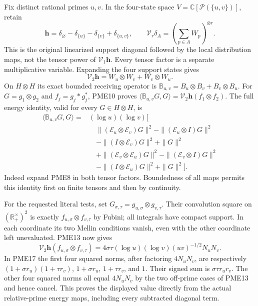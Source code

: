 \documentclass[11pt]{article}
\begin{document}
Fix distinct rational primes $u,v$. In the four-state space
$V=\mathbb C[\mathcal P(\{u,v\})]$, retain
\[
 \mathbf h=\delta_\varnothing-\delta_{\{u\}}
              -\delta_{\{v\}}+\delta_{\{u,v\}},\qquad
 \mathcal V_r\delta_A=\left(\sum_{p\in A}W_p\right)^{\otimes r}.
 \tag{PME15}
\]
This is the original linearized support diagonal followed by the
local distribution maps, not the tensor power of $\mathcal V_1\mathbf h$.
Every tensor factor is a separate multiplicative variable. Expanding
the four support states gives
\[
 \mathcal V_2\mathbf h=W_u\otimes W_v+W_v\otimes W_u.
 \tag{PME16}
\]
On $H\otimes H$ its exact bounded receiving operator is
$\mathbb B_{u,v}=B_u\otimes B_v+B_v\otimes B_u$.
For $G=g_1\otimes g_2$ and $f_j=g_j*g_j^*$,
PME10 proves $\langle\mathbb B_{u,v}G,G\rangle
=\mathcal V_2\mathbf h(f_1\otimes f_2)$.
The full energy identity, valid for every $G\in H\otimes H$, is
\[
\begin{aligned}
\langle\mathbb B_{u,v}G,G\rangle
={}&(\log u)(\log v)\big[\\
&\quad\|(\mathcal E_u\otimes\mathcal E_v)G\|^2
-\|(\mathcal E_u\otimes I)G\|^2\\
&\quad-\|(I\otimes\mathcal E_v)G\|^2+\|G\|^2\\
&\quad+\|(\mathcal E_v\otimes\mathcal E_u)G\|^2
-\|(\mathcal E_v\otimes I)G\|^2\\
&\quad-\|(I\otimes\mathcal E_u)G\|^2+\|G\|^2\big].
\end{aligned}
\tag{PME17}
\]
Indeed expand PME8 in both tensor factors. Boundedness of all maps
permits this identity first on finite tensors and then by continuity.

For the requested literal tests, set
$G_{\sigma,\tau}=g_{u,\sigma}\otimes g_{v,\tau}$.
Their convolution square on $(\mathbb R_+^\times)^2$ is exactly
$f_{u,\sigma}\otimes f_{v,\tau}$ by Fubini; all integrals have
compact support. In each coordinate its two Mellin conditions vanish,
even with the other coordinate left unevaluated. PME13 now gives
\[
\boxed{
 \mathcal V_2\mathbf h(f_{u,\sigma}\otimes f_{v,\tau})
 =4\sigma\tau(\log u)(\log v)(uv)^{-1/2}N_uN_v.}
\tag{PME18}
\]
In PME17 the first four squared norms, after factoring $4N_uN_v$,
are respectively
$(1+\sigma r_u)(1+\tau r_v)$,
$1+\sigma r_u$, $1+\tau r_v$, and $1$.
Their signed sum is $\sigma\tau r_ur_v$.
The other four squared norms all equal $4N_uN_v$ by the two
off-prime cases of PME13 and hence cancel. This proves the displayed
value directly from the actual relative-prime energy maps, including
every subtracted diagonal term.
\end{document}
